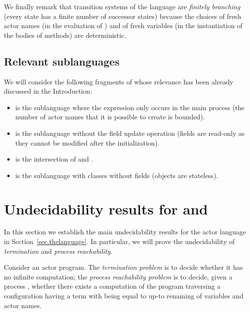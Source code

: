 \documentclass{LMCS}
\theoremstyle{plain}\newtheorem{proposition}[thm]{Proposition}
\theoremstyle{plain}\newtheorem{lemma}[thm]{Lemma}
\theoremstyle{plain}\newtheorem{theorem}[thm]{Theorem}
\theoremstyle{plain}\newtheorem{corollary}[thm]{Corollary}
\newcommand{\actor}{}
\newcommand{\actro}{}
\newcommand{\actba}{}
\newcommand{\actroba}{}
\newcommand{\actsl}{}
\begin{document}
We finally remark that transition systems of the language {\actor} are 
\emph{finitely branching} (every state has a finite number of successor states)
because the choices of fresh actor names (in the evaluation of 
) and of fresh variables (in the instantiation of the bodies
of methods) are deterministic. 


\subsection{Relevant sublanguages}
We will consider the following fragments of {\actor}
whose relevance has been already discussed in the Introduction:
\begin{itemize}[label=\actba]
\item[{\actba}] is the sublanguage where the  expression 
only occurs in the main process (the number of actor names that it is
possible to create is bounded).
\item[{\actro}] is the sublanguage without the field
update operation  (fields are read-only 
as they cannot be modified after the
initialization). 
\item[{\actroba}] is the intersection of {\actba} and {\actro}.
\item[{\actsl}] is the sublanguage with classes without fields
(objects are stateless).
\end{itemize}

\section{Undecidability results for {\actba} and {\actro}}
\label{sec.undecidability}
In this section we establish the main undecidability results 
for the actor language in Section~\ref{sec.thelanguage}.
In particular, we will prove the undecidability of \emph{termination}
and \emph{process reachability}. 

\begin{defi}
\label{def.termandreach}
Consider an actor program.
The \emph{termination problem} is to decide whether it has no infinite computation;
the \emph{process reachability problem} is to decide,
given a process , whether there exists  a computation of the program
traversing a configuration having a term 
with  being equal
to  up-to renaming of variables and actor names.
\end{defi}
\end{document}
